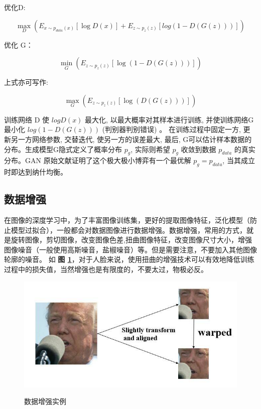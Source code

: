 优化D:

\begin{equation}
\max_D (E_{x \sim p_{data}(x)} [ \log D(x) ] + E_{z \sim p_z(z)} [ log (1 - D(G(z)))])
\end{equation}


优化 G：

\begin{equation}
\min_G (E_{z \sim p_z(z)} [\log (1 - D(G(z)))])
\end{equation}

上式亦可写作:


\begin{equation}
\max_G (E_{z \sim p_z(z)} [ \log (D(G(z)))])
\end{equation}


训练网络 D 使 $log D(x)$ 最大化, 以最大概率对其样本进行训练, 并使训练网络G最小化 $log (1-D (G (z) ) )$ (判别器判别错误) 。
在训练过程中固定一方, 更新另一方网络参数, 交替迭代, 使另一方的误差最大, 最后, G可以估计样本数据的分布。生成模型G隐式定义了概率分布 $p_g$, 实际则希望 $p_g$ 收敛到数据 $p_{data}$ 的真实分布。GAN 原始文献证明了这个极大极小博弈有一个最优解 $p_g = p_{data}$, 当其成立时即达到纳什均衡。

\subsection{数据增强}
在图像的深度学习中，为了丰富图像训练集，更好的提取图像特征，泛化模型（防止模型过拟合），一般都会对数据图像进行数据增强。数据增强，常用的方式，就是旋转图像，剪切图像，改变图像色差,扭曲图像特征，改变图像尺寸大小，增强图像噪音（一般使用高斯噪音，盐椒噪音）等。但是需要注意，不要加入其他图像轮廓的噪音。
如 \textbf{图 \ref{fig:data_aug}}，对于人脸来说，使用扭曲的增强技术可以有效地降低训练过程中的损失值，当然增强也是有限度的，不要太过，物极必反。

\begin{figure}[h!]
	\caption{数据增强实例}
	\centering
	\includegraphics[width=\textwidth]{data_aug.jpg}
	\label{fig:data_aug}
\end{figure}

